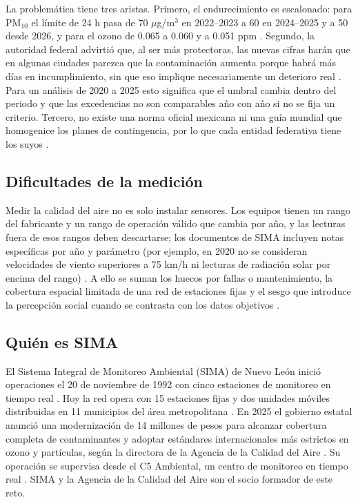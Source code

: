 \documentclass[11pt,letterpaper]{article}
\newcommand{\ugm}{$\mu$g/m$^{3}$}
\begin{document}
La problem\'atica tiene tres aristas. Primero, el endurecimiento es escalonado: para PM$_{10}$ el l\'imite de 24 h pasa de 70 \ugm{} en 2022--2023 a 60 en 2024--2025 y a 50 desde 2026, y para el ozono de 0.065 a 0.060 y a 0.051 ppm \cite{sinaica}. Segundo, la autoridad federal advirti\'o que, al ser m\'as protectoras, las nuevas cifras har\'an que en algunas ciudades parezca que la contaminaci\'on aumenta porque habr\'a m\'as d\'ias en incumplimiento, sin que eso implique necesariamente un deterioro real \cite{universal2025}. Para un an\'alisis de 2020 a 2025 esto significa que el umbral cambia dentro del periodo y que las excedencias no son comparables a\~no con a\~no si no se fija un criterio. Tercero, no existe una norma oficial mexicana ni una gu\'ia mundial que homogenice los planes de contingencia, por lo que cada entidad federativa tiene los suyos \cite{universal2025}.

\subsection{Dificultades de la medici\'on}
Medir la calidad del aire no es solo instalar sensores. Los equipos tienen un rango del fabricante y un rango de operaci\'on v\'alido que cambia por a\~no, y las lecturas fuera de esos rangos deben descartarse; los documentos de SIMA incluyen notas espec\'ificas por a\~no y par\'ametro (por ejemplo, en 2020 no se consideran velocidades de viento superiores a 75 km/h ni lecturas de radiaci\'on solar por encima del rango) \cite{sima_ranges}. A ello se suman los huecos por fallas o mantenimiento, la cobertura espacial limitada de una red de estaciones fijas y el sesgo que introduce la percepci\'on social cuando se contrasta con los datos objetivos \cite{sanchez2026}.

\subsection{Qui\'en es SIMA}
El Sistema Integral de Monitoreo Ambiental (SIMA) de Nuevo Le\'on inici\'o operaciones el 20 de noviembre de 1992 con cinco estaciones de monitoreo en tiempo real \cite{sima_uanl}. Hoy la red opera con 15 estaciones fijas y dos unidades m\'oviles distribuidas en 11 municipios del \'area metropolitana \cite{sima_nl}. En 2025 el gobierno estatal anunci\'o una modernizaci\'on de 14 millones de pesos para alcanzar cobertura completa de contaminantes y adoptar est\'andares internacionales m\'as estrictos en ozono y part\'iculas, seg\'un la directora de la Agencia de la Calidad del Aire \cite{sima_abc}. Su operaci\'on se supervisa desde el C5 Ambiental, un centro de monitoreo en tiempo real \cite{sima_nl}. SIMA y la Agencia de la Calidad del Aire son el socio formador de este reto.
\end{document}
